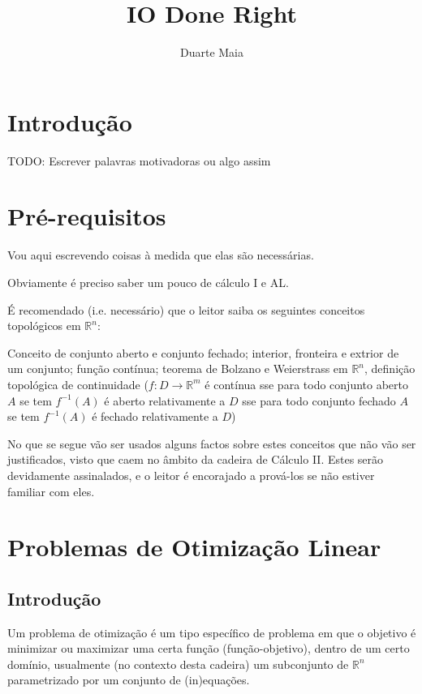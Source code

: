 \documentclass{article}
\title{IO Done Right}
\author{Duarte Maia}
\date{}
\newcommand{\R}{\mathbb{R}}
\theoremstyle{definition}
\begin{document}
	\maketitle
	
	\tableofcontents
	
	\section{Introdução}
	
	TODO: Escrever palavras motivadoras ou algo assim
	
	\section{Pré-requisitos}
	
	Vou aqui escrevendo coisas à medida que elas são necessárias.
	
	Obviamente é preciso saber um pouco de cálculo I e AL.
	
	É recomendado (i.e. necessário) que o leitor saiba os seguintes conceitos topológicos em $\R^n$:
	
	Conceito de conjunto aberto e conjunto fechado; interior, fronteira e extrior de um conjunto; função contínua; teorema de Bolzano e Weierstrass em $\R^n$, definição topológica de continuidade ($f : D \rightarrow \R^m$ é contínua sse para todo conjunto aberto $A$ se tem $f^{-1}(A)$ é aberto relativamente a $D$ sse para todo conjunto fechado $A$ se tem $f^{-1}(A)$ é fechado relativamente a $D$)
	
	No que se segue vão ser usados alguns factos sobre estes conceitos que não vão ser justificados, visto que caem no âmbito da cadeira de Cálculo II. Estes serão devidamente assinalados, e o leitor é encorajado a prová-los se não estiver familiar com eles.
	
	\section{Problemas de Otimização Linear}
	
	\subsection{Introdução}
	
	Um problema de otimização é um tipo específico de problema em que o objetivo é minimizar ou maximizar uma certa função (função-objetivo), dentro de um certo domínio, usualmente (no contexto desta cadeira) um subconjunto de $\R^n$ parametrizado por um conjunto de (in)equações.
	
\end{document}
